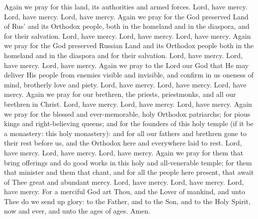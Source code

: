 \begin{liturgicaltext}
    \deacon Again we pray for this land, its authorities and armed forces.
    \choir Lord, have mercy. Lord, have mercy. Lord, have mercy.
    \deacon Again we pray for the God preserved Land of Rus' and its Orthodox people, both in the homeland and in the diaspora, and for their salvation.
    \choir Lord, have mercy. Lord, have mercy. Lord, have mercy.
    \deacon Again we pray for the God preserved Russian Land and its Orthodox people both in the homeland and in the diaspora and for their salvation.
    \choir Lord, have mercy. Lord, have mercy. Lord, have mercy.
    \deacon Again we pray to the Lord our God that He may deliver His people from enemies visible and invisible, and confirm in us oneness of mind, brotherly love and piety.
    \choir Lord, have mercy. Lord, have mercy. Lord, have mercy.
    \deacon Again we pray for our brethren, the priests, priestmonks, and all our brethren in Christ.
    \choir Lord, have mercy. Lord, have mercy. Lord, have mercy.
    \deacon Again we pray for the blessed and ever-memorable, holy Orthodox patriarchs; for pious kings and right-believing queens; and for the founders of this holy temple (if it be a monastery: this holy monastery): and for all our fathers and brethren gone to their rest before us, and the Orthodox here and everywhere laid to rest.
    \choir Lord, have mercy. Lord, have mercy. Lord, have mercy.
    \deacon Again we pray for them that bring offerings and do good works in this holy and all-venerable temple; for them that minister and them that chant, and for all the people here present, that await of Thee great and abundant mercy.
    \choir Lord, have mercy. Lord, have mercy. Lord, have mercy.
    \priest For a merciful God art Thou, and the Lover of mankind, and unto Thee do we send up glory: to the Father, and to the Son, and to the Holy Spirit, now and ever, and unto the ages of ages.
    \choir Amen.
\end{liturgicaltext}


